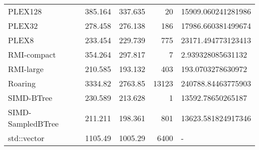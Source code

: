 \begin{tabular}{lrrrl}
 PLEX128           &                385.164 &               337.635 &           20 & 15909.060241281986 \\
 PLEX32            &                278.458 &               276.138 &          186 & 17986.660381499674 \\
 PLEX8             &                233.454 &               229.739 &          775 & 23171.494773123413 \\
 RMI-compact       &                354.264 &               297.817 &            7 & 2.939328085631132  \\
 RMI-large         &                210.585 &               193.132 &          403 & 193.0703278630972  \\
 Roaring           &               3334.82  &              2763.85  &        13123 & 240788.84463775903 \\
 SIMD-BTree        &                230.589 &               213.628 &            1 & 13592.78650265187  \\
 SIMD-SampledBTree &                211.211 &               198.361 &          801 & 13623.581824917346 \\
 std::vector       &               1105.49  &              1005.29  &         6400 & -                  \\
\hline
\end{tabular}